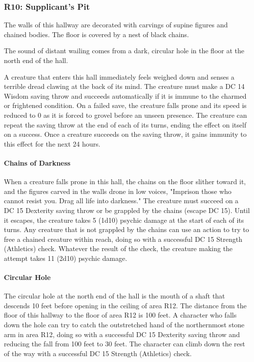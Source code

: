 \documentclass[10pt,a4paper,twoside,bg=print,twocolumn,openany,nodeprecatedcode]{dndbook}
\begin{document}
\subsubsection{R10: Supplicant's Pit}
\begin{DndReadAloud}{}
The walls of this hallway are decorated with carvings of supine figures and chained bodies. The floor is covered by a nest of black chains.

The sound of distant wailing comes from a dark, circular hole in the floor at the north end of the hall.

\end{DndReadAloud}

A creature that enters this hall immediately feels weighed down and senses a terrible dread clawing at the back of its mind. The creature must make a DC 14 Wisdom saving throw and succeeds automatically if it is immune to the charmed or frightened condition. On a failed save, the creature falls prone and its speed is reduced to 0 as it is forced to grovel before an unseen presence. The creature can repeat the saving throw at the end of each of its turns, ending the effect on itself on a success. Once a creature succeeds on the saving throw, it gains immunity to this effect for the next 24 hours.

\paragraph{Chains of Darkness}
When a creature falls prone in this hall, the chains on the floor slither toward it, and the figures carved in the walls drone in low voices, "Imprison those who cannot resist you. Drag all life into darkness." The creature must succeed on a DC 15 Dexterity saving throw or be grappled by the chains (escape DC 15). Until it escapes, the creature takes 5 (1d10) psychic damage at the start of each of its turns. Any creature that is not grappled by the chains can use an action to try to free a chained creature within reach, doing so with a successful DC 15 Strength (Athletics) check. Whatever the result of the check, the creature making the attempt takes 11 (2d10) psychic damage.

\paragraph{Circular Hole}
The circular hole at the north end of the hall is the mouth of a shaft that descends 10 feet before opening in the ceiling of area R12. The distance from the floor of this hallway to the floor of area R12 is 100 feet. A character who falls down the hole can try to catch the outstretched hand of the northernmost stone arm in area R12, doing so with a successful DC 15 Dexterity saving throw and reducing the fall from 100 feet to 30 feet. The character can climb down the rest of the way with a successful DC 15 Strength (Athletics) check.
\end{document}
